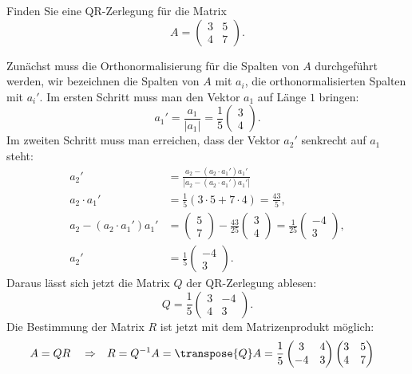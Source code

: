 Finden Sie eine QR-Zerlegung für die Matrix
\[
A=\begin{pmatrix}
3&5\\
4&7
\end{pmatrix}.
\]


\begin{loesung}
Zunächst muss die Orthonormalisierung für die Spalten von $A$
durchgeführt werden, wir bezeichnen die Spalten von $A$ mit $a_i$,
die orthonormalisierten Spalten mit $a_i'$. Im ersten Schritt muss man
den Vektor $a_1$ auf Länge $1$ bringen:
\[
a_1'=\frac{a_1}{|a_1|}=\frac15\begin{pmatrix}3\\4\end{pmatrix}.
\]
Im zweiten Schritt muss man erreichen, dass der Vektor $a_2'$ senkrecht
auf $a_1$ steht:
\begin{align*}
a_2'&=\frac{a_2-(a_2\cdot a_1')a_1'}{|a_2-(a_2\cdot a_1')a_1'|}\\
a_2\cdot a_1'&=\frac15(3\cdot 5+7\cdot 4)=\frac{43}{5},\\
a_2-(a_2\cdot a_1')a_1'&=
\begin{pmatrix}5\\7\end{pmatrix}
-\frac{43}{25}\begin{pmatrix}3\\4\end{pmatrix}
=\frac{1}{25}\begin{pmatrix}-4\\3\end{pmatrix},
\\
a_2'&=\frac15\begin{pmatrix}-4\\3\end{pmatrix}.
\end{align*}
Daraus lässt sich jetzt die Matrix $Q$ der QR-Zerlegung ablesen:
\[
Q=\frac15
\begin{pmatrix}
3&-4\\
4& 3
\end{pmatrix}.
\]
Die Bestimmung der Matrix $R$ ist jetzt mit dem Matrizenprodukt möglich:
\begin{align*}
A&=QR&&\Rightarrow&R&=Q^{-1}A=\transpose{Q}A=\frac15\begin{pmatrix}3&4\\-4&3\end{pmatrix}
\begin{pmatrix}3&5\\4&7\end{pmatrix}

\end{align*}
\end{loesung}
